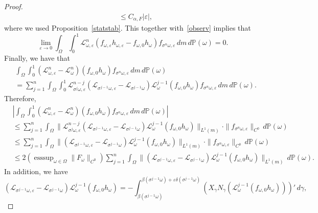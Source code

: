 \documentclass[12pt,reqno,a4paper]{article}
\DeclareMathOperator{\esssup}{esssup}
\begin{document}
\begin{proof}
\[\begin{split}
			&\le C_{\alpha, F}|\varepsilon| ,
		\end{split}
		\]
		where we used Proposition~\ref{statstab}. This together with~\eqref{observ} implies that 
		\[
		\lim_{\varepsilon \to 0}\int_\Omega \int_0^1 \mathcal L_{\omega, \varepsilon}^n(f_{\omega, \varepsilon}h_{\omega, \varepsilon}-f_{\omega, 0}h_\omega) f_{\sigma^n \omega, \varepsilon}\, dm\, d\mathbb P(\omega)=0.
		\]
		Finally, we have that 
		\[
		\begin{split}
			&\int_\Omega \int_0^1 (\mathcal L_{\omega, \varepsilon}^n-\mathcal L_\omega^n)(f_{\omega, 0}h_\omega) f_{\sigma^n \omega, \varepsilon}\, dm\, d\mathbb P(\omega) \\
			&=\sum_{j=1}^n \int_\Omega \int_0^1 \mathcal L_{\sigma^j \omega, \varepsilon}^{n-j}(\mathcal L_{\sigma^{j-1}\omega, \varepsilon}-\mathcal L_{\sigma^{j-1}\omega}) \mathcal L_\omega^{j-1}(f_{\omega, 0}h_\omega)f_{\sigma^n \omega, \varepsilon}\, dm\, d\mathbb P(\omega).
		\end{split}
		\]
		Therefore, 
		\[
		\begin{split}
			&\left |\int_\Omega \int_0^1 (\mathcal L_{\omega, \varepsilon}^n-\mathcal L_\omega^n)(f_{\omega, 0}h_\omega) f_{\sigma^n \omega, \varepsilon}\, dm\, d\mathbb P(\omega) \right | \\
			&\le \sum_{j=1}^n \int_\Omega \|\mathcal L_{\sigma^j \omega, \varepsilon}^{n-j}(\mathcal L_{\sigma^{j-1}\omega, \varepsilon}-\mathcal L_{\sigma^{j-1}\omega}) \mathcal L_\omega^{j-1}(f_{\omega, 0}h_\omega)\|_{L^1(m)}\cdot \|f_{\sigma^n \omega, \varepsilon}\|_{C^0}\, d\mathbb P(\omega) \\
			&\le \sum_{j=1}^n \int_\Omega \|(\mathcal L_{\sigma^{j-1}\omega, \varepsilon}-\mathcal L_{\sigma^{j-1}\omega}) \mathcal L_\omega^{j-1}(f_{\omega, 0}h_\omega)\|_{L^1(m)}\cdot \|f_{\sigma^n \omega, \varepsilon}\|_{C^0}\, d\mathbb P(\omega) \\
			&\le 2 \left (\esssup_{\omega \in \Omega}\|F_\omega\|_{C^0}\right )\sum_{j=1}^n \int_\Omega \|(\mathcal L_{\sigma^{j-1}\omega, \varepsilon}-\mathcal L_{\sigma^{j-1}\omega}) \mathcal L_\omega^{j-1}(f_{\omega, 0}h_\omega)\|_{L^1(m)}\, d\mathbb P(\omega).
		\end{split}
		\]
		In addition,  we have
		\[
		(\mathcal L_{\sigma^{j-1}\omega, \varepsilon}-\mathcal L_{\sigma^{j-1}\omega}) \mathcal L_\omega^{j-1}(f_{\omega, 0}h_\omega)=-\int_{\beta(\sigma^{j-1}\omega)}^{\beta(\sigma^{j-1}\omega)+\varepsilon \delta (\sigma^{j-1}\omega)} (X_\gamma N_\gamma (\mathcal L_\omega^{j-1}(f_{\omega, 0}h_\omega)))'\, d\gamma,
\]
\end{proof}
\end{document}
